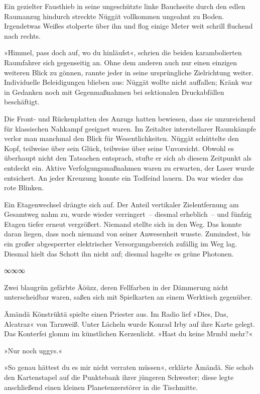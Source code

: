 Ein gezielter Fausthieb in seine ungeschützte linke Bauchseite durch den edlen Raumanzug hindurch streckte Nüggät vollkommen ungeahnt zu Boden. Irgendetwas Weißes stolperte über ihn und flog einige Meter weit schrill fluchend nach rechts.

»Himmel, pass doch auf, wo du hinläufst«, schrien die beiden karambolierten Raumfahrer sich gegenseitig an. Ohne dem anderen auch nur einen einzigen weiteren Blick zu gönnen, rannte jeder in seine ursprüngliche Zielrichtung weiter. Individuelle Beleidigungen blieben aus: Nüggät wollte nicht auffallen; Kränk war in Gedanken noch mit Gegenmaßnahmen bei sektionalen Druckabfällen beschäftigt.

Die Front- und Rückenplatten des Anzugs hatten bewiesen, dass sie unzureichend für klassischen Nahkampf geeignet waren. Im Zeitalter interstellarer Raumkämpfe verlor man manchmal den Blick für Wesentlichkeiten. Nüggät schüttelte den Kopf, teilweise über sein Glück, teilweise über seine Unvorsicht. Obwohl es überhaupt nicht den Tatsachen entsprach, stufte er sich ab diesem Zeitpunkt als entdeckt ein. Aktive Verfolgungsmaßnahmen waren zu erwarten, der Laser wurde entsichert. An jeder Kreuzung konnte ein Todfeind lauern. Da war wieder das rote Blinken.

Ein Etagenwechsel drängte sich auf. Der Anteil vertikaler Zielentfernung am Gesamtweg nahm zu, wurde wieder verringert~– diesmal erheblich~– und fünfzig Etagen tiefer erneut vergrößert. Niemand stellte sich in den Weg. Das konnte daran liegen, dass noch niemand von seiner Anwesenheit wusste. Zumindest, bis ein großer abgesperrter elektrischer Versorgungsbereich zufällig im Weg lag. Diesmal hielt das Schott ihn nicht auf; diesmal hagelte es grüne Photonen.

\begin{center}
∞∞∞
\end{center}

Zwei blaugrün gefärbte Äöüzz, deren Fellfarben in der Dämmerung nicht unterscheidbar waren, saßen sich mit Spielkarten an einem Werktisch gegenüber.

Ämändä Könstrüktä spielte einen Priester aus. Im Radio lief »Dies, Das, Alcatraz« von Tarnweiß. Unter Lächeln wurde Konrad Irby auf ihre Karte gelegt. Das Konterfei glomm im künstlichen Kerzenlicht. »Hast du keine Mrmbl mehr?«

»Nur noch uggys.«

»So genau hättest du es mir nicht verraten müssen«, erklärte Ämändä. Sie schob den Kartenstapel auf die Punktebank ihrer jüngeren Schwester; diese legte anschließend einen kleinen Planetenzerstörer in die Tischmitte.

